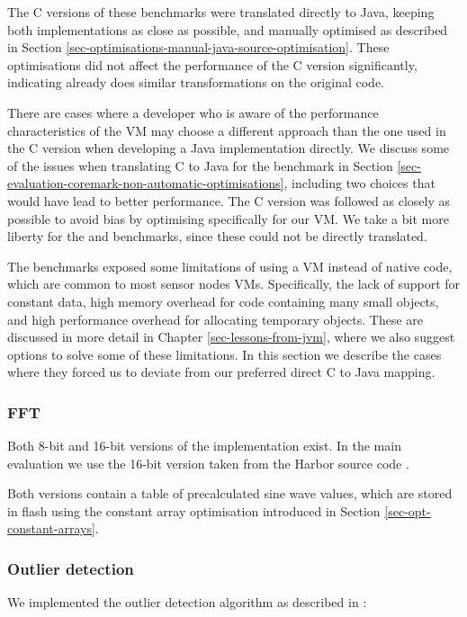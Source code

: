 The C versions of these benchmarks were translated directly to Java, keeping both implementations as close as possible, and manually optimised as described in Section \ref{sec-optimisations-manual-java-source-optimisation}. These optimisations did not affect the performance of the C version significantly, indicating  already does similar transformations on the original code.

There are cases where a developer who is aware of the performance characteristics of the VM may choose a different approach than the one used in the C version when developing a Java implementation directly. We discuss some of the issues when translating C to Java for the  benchmark in Section \ref{sec-evaluation-coremark-non-automatic-optimisations}, including two choices that would have lead to better performance. The C version was followed as closely as possible to avoid bias by optimising specifically for our VM. We take a bit more liberty for the  and  benchmarks, since these could not be directly translated.

The benchmarks exposed some limitations of using a VM instead of native code, which are common to most sensor nodes VMs. Specifically, the lack of support for constant data, high memory overhead for code containing many small objects, and high performance overhead for allocating temporary objects. These are discussed in more detail in Chapter \ref{sec-lessons-from-jvm}, where we also suggest options to solve some of these limitations. In this section we describe the cases where they forced us to deviate from our preferred direct C to Java mapping.

\subsubsection{FFT}
Both 8-bit and 16-bit versions of the  implementation exist. In the main evaluation we use the 16-bit version taken from the Harbor source code \cite{sos-operating-system}.

Both versions contain a table of precalculated sine wave values, which are stored in flash using the constant array optimisation introduced in Section \ref{sec-opt-constant-arrays}.

\subsubsection{Outlier detection}
We implemented the outlier detection algorithm as described in \cite{Kumar:2007ge}:

